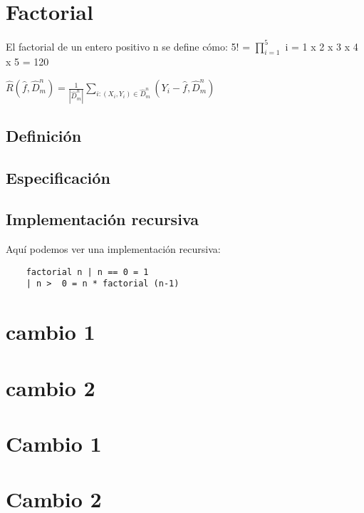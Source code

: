 \documentclass{article}
\begin{document}
\section{Factorial}


El factorial de un entero positivo n se define cómo: 5! = $\prod_{i=1}^{5}$ i = 1 x 2 x 3 x 4 x 5 = 120 


$\hat{R}(\hat{f}, \hat{D}_m^n ) = \frac{1}{|\hat{D}_m^n|} \sum_{i:(X_i, Y_i) \in \hat{D}_m^n }^{} (Y_i - \hat{f}, \hat{D}_m^n) $

\subsection{Definición}



\subsection{Especificación}


\subsection{Implementación recursiva}

Aquí podemos ver una implementación recursiva:

\begin{verbatim}
	factorial n | n == 0 = 1
	| n >  0 = n * factorial (n-1)
\end{verbatim}

\section{cambio 1}


\section{cambio 2}




\section{Cambio 1}
\section{Cambio 2}
\end{document}
